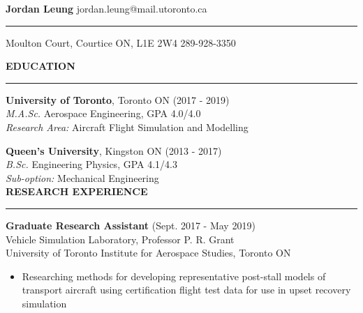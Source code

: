 \documentclass[11pt,letterpaper]{article}
\begin{document}
{\Huge\textbf{Jordan Leung}} \hfill  jordan.leung@mail.utoronto.ca
\vspace{0.1cm}
\hrule
\vspace{0.25cm}
 Moulton Court, Courtice ON, L1E 2W4 \hfill 289-928-3350
\vspace{0.25cm}


{\large\textbf{EDUCATION}} %
\vspace{0.1cm}
\hrule
\vspace{0.25cm}
\textbf{University of Toronto}, Toronto ON \hfill (2017 - 2019) \\
\textit{M.A.Sc.} Aerospace Engineering, GPA 4.0/4.0 \\
\textit{Research Area:} Aircraft Flight Simulation and Modelling

\vspace{0.3cm}
\textbf{Queen's University}, Kingston ON \hfill (2013 - 2017) \\
\textit{B.Sc.} Engineering Physics, GPA 4.1/4.3 \\
\textit{Sub-option:} Mechanical Engineering \\


{\large\textbf{RESEARCH EXPERIENCE}}
\vspace{0.1cm}
\hrule
\vspace{0.25cm}

\textbf{Graduate Research Assistant}  \hfill  (Sept. 2017 - May 2019) \\
Vehicle Simulation Laboratory, Professor P. R. Grant \\ University of Toronto Institute for Aerospace Studies, Toronto ON  \\
\vspace{-0.6cm}
\begin{itemize}
	\item  Researching methods for developing representative post-stall models of transport aircraft using certification flight test data for use in upset recovery simulation
\end{itemize}
\vspace{-0.2cm}
\end{document}
